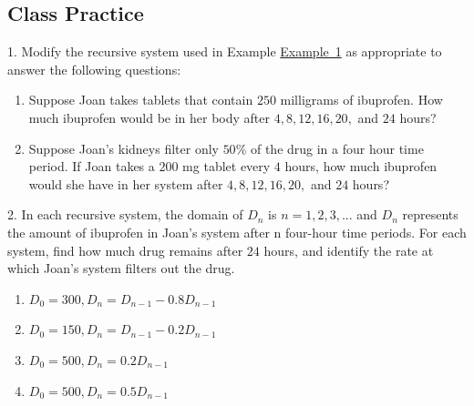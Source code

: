 \documentclass[10pt,]{book}
\theoremstyle{plain}
\theoremstyle{definition}
\theoremstyle{definition}
\theoremstyle{definition}
\numberwithin{equation}{section}
\begin{document}
\subsection[{Class Practice}]{Class Practice}\label{exercises-1}
\begin{exerciselist}
\item[1.]\hypertarget{exercise-1}{}Modify the recursive system used in Example \hyperref[ibuprofen-example-one-dose]{Example~1} as appropriate to answer the following questions: \leavevmode%
\begin{enumerate}[label=(\alph*)]
\item\hypertarget{li-1}{}Suppose Joan takes tablets that contain \(250\) milligrams of ibuprofen. How much ibuprofen would be in her body after \(4, 8, 12, 16, 20,\) and \(24\) hours?%
\item\hypertarget{li-2}{}Suppose Joan's kidneys filter only \(50\%\) of the drug in a four hour time period.  If Joan takes a \(200\) mg tablet every \(4\) hours, how much ibuprofen would she have in her system after \(4, 8, 12, 16, 20,\) and \(24\) hours?%
\end{enumerate}
%
\par\smallskip
\item[2.]\hypertarget{exercise-2}{}In each recursive system, the domain of \(D_n\) is \(n=1,2,3, ...\) and \(D_n\) represents the amount of ibuprofen in Joan's system after n four-hour time periods.  For each system, find how much drug remains after \(24\) hours, and identify the rate at which Joan's system filters out the drug. \leavevmode%
\begin{enumerate}[label=(\alph*)]
\item\hypertarget{li-3}{}\(D_0=300, D_n=D_{n-1} - 0.8D_{n-1}\)%
\item\hypertarget{li-4}{}\(D_0=150, D_n=D_{n-1} - 0.2D_{n-1}\)%
\item\hypertarget{li-5}{}\(D_0=500, D_n=0.2D_{n-1}\)%
\item\hypertarget{li-6}{}\(D_0=500, D_n=0.5D_{n-1}\)%
\end{enumerate}
%
\par\smallskip
\end{exerciselist}
\end{document}
